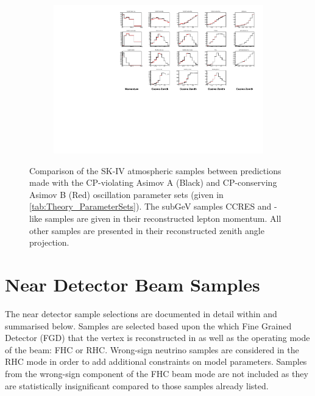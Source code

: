 \begin{figure}
  \centering
  \begin{subfigure}[t]{\textwidth}
    \includegraphics[width=\textwidth, trim={0mm 0mm 0mm 0mm}, clip,page=1]{Figures/Selections/HistogramComparison.pdf}
  \end{subfigure}
  \caption{Comparison of the SK-IV atmospheric samples between predictions made with the CP-violating Asimov A (Black) and CP-conserving Asimov B (Red) oscillation parameter sets (given in \autoref{tab:Theory_ParameterSets}). The subGeV samples CCRES and -like samples are given in their reconstructed lepton momentum. All other samples are presented in their reconstructed zenith angle projection.}
  \label{fig:SelsAndSysts_AllSampleComparison}
\end{figure}

\clearpage
\section{Near Detector Beam Samples}
\label{sec:SelsAndSysts_Sels_ND}

The near detector sample selections are documented in detail within \cite{t2k_tn_395} and summarised below. Samples are selected based upon the which Fine Grained Detector (FGD) that the vertex is reconstructed in as well as the operating mode of the beam: FHC or RHC. Wrong-sign neutrino samples are considered in the RHC mode in order to add additional constraints on model parameters. Samples from the wrong-sign component of the FHC beam mode are not included as they are statistically insignificant compared to those samples already listed.


